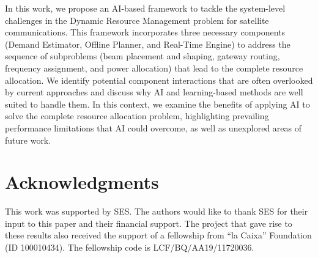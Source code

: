 \documentclass[letterpaper]{article} %
\begin{document}
In this work, we propose an AI-based framework to tackle the system-level challenges in the Dynamic Resource Management problem for satellite communications. This framework incorporates three necessary components (Demand Estimator, Offline Planner, and Real-Time Engine) to address the sequence of subproblems (beam placement and shaping, gateway routing, frequency assignment, and power allocation) that lead to the complete resource allocation. We identify potential component interactions that are often overlooked by current approaches and discuss why AI and learning-based methods are well suited to handle them. In this context, we examine the benefits of applying AI to solve the complete resource allocation problem, highlighting prevailing performance limitations that AI could overcome, as well as unexplored areas of future work.



\section*{Acknowledgments}
This work was supported by SES. The authors would like to thank SES for their input to this paper and their financial support. The project that gave rise to these results also received the support of a fellowship from ``la Caixa'' Foundation (ID 100010434). The fellowship code is LCF/BQ/AA19/11720036. 



\end{document}
